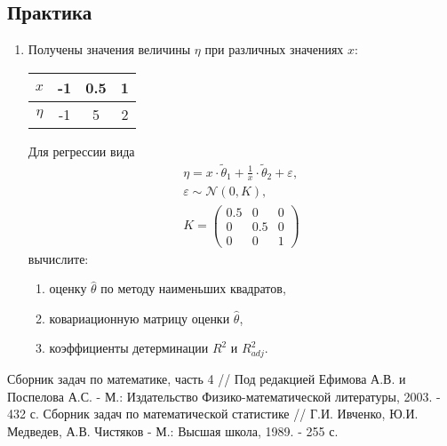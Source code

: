 \documentclass[a4paper,12pt]{article}
\begin{document}
\subsection*{Практика}

\begin{enumerate}
    \item Получены значения величины $\eta$ при различных значениях $x$:
    
    \begin{center}
        \begin{tabular}{|c|c|c|c|}
        \hline
        $x$   & -1 & 0.5 & 1 \\
        \hline
        $\eta$ & -1 & 5 & 2 \\
        \hline
        \end{tabular}
    \end{center}

    Для регрессии вида
    \begin{gather*}
        \eta = x \cdot \widetilde{\theta}_1 + \frac{1}{x} \cdot \widetilde{\theta}_2 + \varepsilon , \\
        \varepsilon \sim \mathcal{N} ( 0, K ), \\
        K = \begin{pmatrix}
            0.5 & 0   & 0 \\
            0   & 0.5 & 0 \\
            0   & 0   & 1
        \end{pmatrix}
    \end{gather*}
    вычислите:
    \begin{enumerate}
        \item оценку $\widehat{\theta}$ по методу наименьших квадратов,
        \item ковариационную матрицу оценки $\widehat{\theta}$,
        \item коэффициенты детерминации $R^2$ и $R_{adj}^2$.
    \end{enumerate}
    
\end{enumerate}

\begin{thebibliography}{2}
       Сборник задач по математике, часть 4 // Под редакцией Ефимова А.В. и Поспелова А.С. - М.: Издательство Физико-математической
      литературы, 2003. - 432 с.
       Сборник задач по математической статистике // Г.И. Ивченко, Ю.И. Медведев, А.В. Чистяков - М.: Высшая школа, 1989. - 255 с.
\end{thebibliography}
\end{document}
